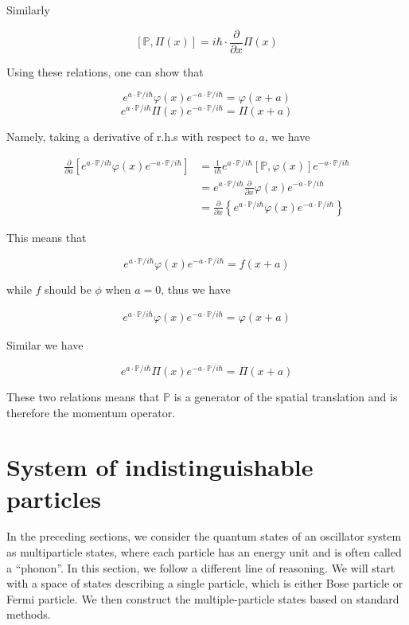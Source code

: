 ﻿\documentclass[twoside]{book}
\numberwithin{equation}{section}
\begin{document}
Similarly

\[[\mathbb{P},\Pi(x)] = i\hbar\cdot\frac{\partial}{\partial x}\Pi(x) \]

Using these relations, one can show that 

\[e^{a\cdot\mathbb{P}/i\hbar}\varphi(x)e^{-a\cdot\mathbb{P}/i\hbar} = \varphi(x+a) \]
\[e^{a\cdot\mathbb{P}/i\hbar}\Pi(x)e^{-a\cdot\mathbb{P}/i\hbar} = \Pi(x+a) \]

Namely, taking a derivative of r.h.s with respect to $a$, we have

\[\begin{split}
\frac{\partial}{\partial a}\left[e^{a\cdot\mathbb{P}/i\hbar}\varphi(x)e^{-a\cdot\mathbb{P}/i\hbar}\right]&=\frac{1}{i\hbar}e^{a\cdot\mathbb{P}/i\hbar}[\mathbb{P},\varphi(x)]e^{-a\cdot\mathbb{P}/i\hbar}\\
&= e^{a\cdot\mathbb{P}/i\hbar}\frac{\partial}{\partial x}\varphi(x)e^{-a\cdot\mathbb{P}/i\hbar}\\
&=\frac{\partial}{\partial x}\left\{e^{a\cdot\mathbb{P}/i\hbar}\varphi(x)e^{-a\cdot\mathbb{P}/i\hbar}\right\}
\end{split}\]

This means that

\[e^{a\cdot\mathbb{P}/i\hbar}\varphi(x)e^{-a\cdot\mathbb{P}/i\hbar} = f(x+a) \]

while $f$ should be $\phi$ when $a=0$, thus we have

\begin{align}
e^{a\cdot\mathbb{P}/i\hbar}\varphi(x)e^{-a\cdot\mathbb{P}/i\hbar} = \varphi(x+a)
\end{align}

Similar we have

\[e^{a\cdot\mathbb{P}/i\hbar}\Pi(x)e^{-a\cdot\mathbb{P}/i\hbar} = \Pi(x+a)
\]

These two relations means that $\mathbb{P}$ is a generator of the spatial translation and is therefore the momentum operator. 


\section{System of indistinguishable particles}

In the preceding sections, we consider the quantum states of an oscillator  system as multiparticle states, where each particle has an energy unit and is often called a ``phonon''. In this section, we follow a different line of reasoning. We will start with a space of states describing a single particle, which is either Bose particle or Fermi particle. We then construct the multiple-particle states based on standard methods. 
\end{document}
